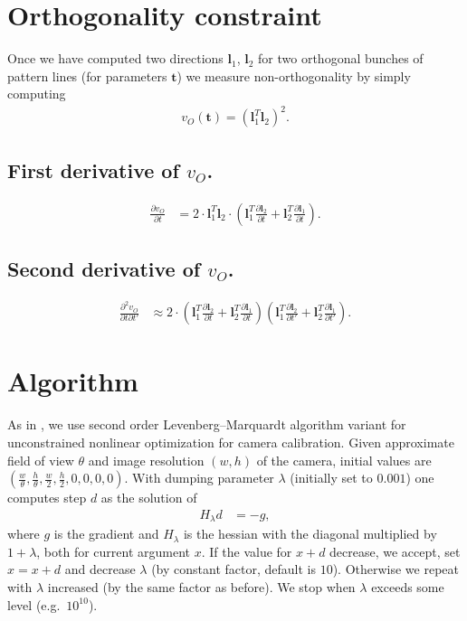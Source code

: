 \documentclass[12pt,a4paper]{amsart}
\renewcommand{\v}[1]{\mathbf{#1}}
\newcommand{\ddd}[2]{\frac{\partial #1}{\partial #2}}
\newcommand{\dddd}[3]{\frac{\partial^2 #1}{\partial #2 \partial #3}}
\begin{document}
\section{Orthogonality constraint}

Once we have computed two directions $\v{l}_1$, $\v{l}_2$ for two orthogonal bunches of pattern lines (for parameters $\v{t}$) we measure non-orthogonality
by simply computing
\begin{align*}
v_O (\v{t}) = (\v{l}_1^T \v{l}_2)^2.
\end{align*}

\subsection{First derivative of $v_O$.}

\begin{align*}
\ddd{v_O}{t} & = 2 \cdot \v{l}_1^T \v{l}_2 \cdot \left( \v{l}_1^T \ddd{\v{l}_2}{t} + \v{l}_2^T \ddd{\v{l}_1}{t} \right).
\end{align*}

\subsection{Second derivative of $v_O$.}

\begin{align*}
\dddd{v_O}{t}{t'} & \approx 2 \cdot \left( \v{l}_1^T \ddd{\v{l}_2}{t} + \v{l}_2^T \ddd{\v{l}_1}{t} \right) \left( \v{l}_1^T \ddd{\v{l}_2}{t'} + \v{l}_2^T \ddd{\v{l}_1}{t'} \right).
\end{align*}

\section{Algorithm}

As in \cite{Kan}, we use second order Levenberg--Marquardt algorithm variant for unconstrained nonlinear optimization for camera calibration.
Given approximate field of view $\theta$ and image resolution $(w, h)$ of the camera, initial values are $(\frac{w}{\theta}, \frac{h}{\theta}, \frac{w}{2}, \frac{h}{2}, 0, 0, 0, 0)$.
With dumping parameter $\lambda$ (initially set to $0.001$) one computes step $d$ as the solution of
\begin{align*}
H_\lambda d & = -g,
\end{align*}
where $g$ is the gradient and $H_\lambda$ is the hessian with the diagonal multiplied by $1 + \lambda$, both for current argument $x$. If the value for $x + d$ decrease, we accept, set $x = x + d$ and decrease $\lambda$ (by constant factor, default is $10$).
Otherwise we repeat with $\lambda$ increased (by the same factor as before). We stop when $\lambda$ exceeds some level (e.g.~$10^{10}$).
\end{document}
